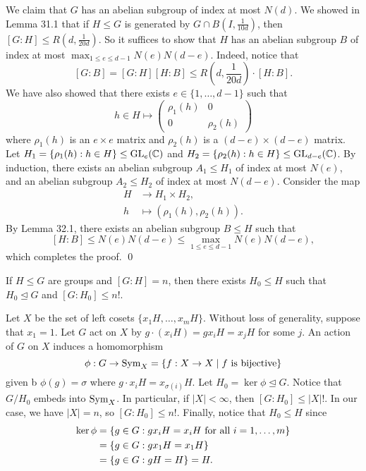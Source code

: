 We claim that $G$ has an abelian subgroup of index at most $N(d)$. 
We showed in Lemma 31.1 that if $H \leq G$ is generated by $G 
\cap B(I, \frac{1}{10d})$, then $[G : H] \leq R(d, \frac{1}{20d})$. 
So it suffices to show that $H$ has an abelian subgroup $B$ of index 
at most $\max_{1\leq e\leq d-1} N(e)N(d-e)$. Indeed, notice that 
\[ [G : B] = [G : H][H : B] \leq R\left(d, \frac{1}{20d}\right) \cdot [H : B]. \] 
We have also showed that there exists $e \in \{1, \dots, d-1\}$ such that 
\[ h \in H \mapsto \begin{pmatrix}
    \rho_1(h) & 0 \\ 0 & \rho_2(h)
\end{pmatrix} \] 
where $\rho_1(h)$ is an $e \times e$ matrix and $\rho_2(h)$ is a 
$(d-e) \times (d-e)$ matrix. Let $H_1 = \{\rho_1(h) : h \in H\} \leq \operatorname{GL}_e(\mathbb{C})$ 
and $H_2 = \{\rho_2(h) : h \in H\} \leq \operatorname{GL}_{d-e}(\mathbb{C})$. By induction, 
there exists an abelian subgroup $A_1 \leq H_1$ of index at most $N(e)$, 
and an abelian subgroup $A_2 \leq H_2$ of index at most $N(d-e)$. Consider the 
map 
\begin{align*}
    H &\to H_1 \times H_2, \\ 
    h &\mapsto (\rho_1(h), \rho_2(h)). 
\end{align*}
By Lemma 32.1, there exists an abelian subgroup $B \leq H$ such that 
\[ [H : B] \leq N(e)N(d-e) \leq \max_{1\leq e\leq d-1} N(e)N(d-e), \] 
which completes the proof. \qed 

\begin{prop}{}
    If $H \leq G$ are groups and $[G : H] = n$, then there exists 
    $H_0 \leq H$ such that $H_0 \trianglelefteq G$ and $[G : H_0] \leq n!$. 
\end{prop}
\begin{pf}
    Let $X$ be the set of left cosets $\{x_1H, \dots, x_mH\}$. Without loss 
    of generality, suppose that $x_1 = 1$. Let $G$ act on $X$ by 
    $g \cdot (x_iH) = gx_iH = x_jH$ for some $j$. An action of $G$ on $X$
    induces a homomorphism 
    \[ \phi : G \to \operatorname{Sym}_X = \{f : X \to X \mid f \text{ is bijective}\} \] 
    given b $\phi(g) = \sigma$ where $g \cdot x_iH = x_{\sigma(i)}H$. Let 
    $H_0 = \ker\phi \trianglelefteq G$. Notice that $G/H_0$ embeds into 
    $\operatorname{Sym}_X$. In particular, if $|X| < \infty$, then $[G : H_0] \leq |X|!$. 
    In our case, we have $|X| = n$, so $[G : H_0] \leq n!$. Finally, 
    notice that $H_0 \leq H$ since 
    \begin{align*}
        \ker\phi &= \{g \in G : gx_iH = x_iH \text{ for all } i = 1, \dots, m\} \\ 
        &= \{g \in G : gx_1H = x_1H\} \\ 
        &= \{g \in G : gH = H\} = H. \qedhere 
    \end{align*}
\end{pf}

